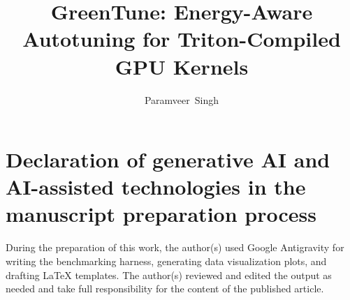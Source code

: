 \documentclass[10pt,journal,compsoc]{IEEEtran}
\begin{document}
\title{GreenTune: Energy-Aware Autotuning for Triton-Compiled GPU Kernels}

\author{Paramveer~Singh\\
}

\IEEEtitleabstractindextext{%

}

\maketitle










\section*{Declaration of generative AI and AI-assisted technologies in the manuscript preparation process}
During the preparation of this work, the author(s) used Google Antigravity for writing the benchmarking harness, generating data visualization plots, and drafting LaTeX templates. The author(s) reviewed and edited the output as needed and take full responsibility for the content of the published article.
\end{document}
